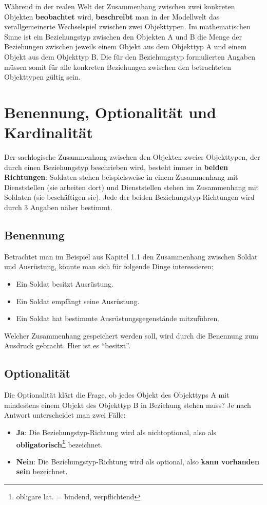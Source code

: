       W\"ahrend in der realen Welt der Zusammenhang zwischen zwei konkreten Objekten \textbf{beobachtet} wird, \textbf{beschreibt} man in der Modellwelt das verallgemeinerte Wechselspiel zwischen zwei Objekttypen. Im mathematischen Sinne ist ein Beziehungstyp zwischen den Objekten A und B die Menge der Beziehungen zwischen jeweils einem Objekt aus dem Objekttyp A und einem Objekt aus dem Objekttyp B. Die f\"ur den Beziehungstyp formulierten Angaben m\"ussen somit f\"ur alle konkreten Beziehungen zwischen den betrachteten Objekttypen g\"ultig sein.
      \section{Benennung, Optionalit\"at und Kardinalit\"at}\label{naming_optionaliy_kardinality}
        Der sachlogische Zusammenhang zwischen den Objekten zweier Objekttypen, der durch einen Beziehungstyp beschrieben wird, besteht immer in \textbf{beiden Richtungen}: Soldaten stehen beispielsweise in einem Zusammenhang mit Dienststellen (sie arbeiten dort) und Dienststellen stehen im Zusammenhang mit Soldaten (sie besch\"aftigen sie). Jede der beiden Beziehungstyp-Richtungen wird durch 3 Angaben n\"aher bestimmt.
        \subsection{Benennung}
          Betrachtet man im Beispiel aus Kapitel 1.1 den Zusammenhang zwischen Soldat und Ausr\"ustung, k\"onnte man sich f\"ur folgende Dinge interessieren:
          \begin{itemize}
            \item Ein Soldat besitzt Ausr\"ustung.
            \item Ein Soldat empf\"angt seine Ausr\"ustung.
            \item Ein Soldat hat bestimmte Ausr\"ustungsgegenst\"ande mitzuf\"uhren.
          \end{itemize}
          Welcher Zusammenhang gespeichert werden soll, wird durch die Benennung zum Ausdruck gebracht.
          Hier ist es \enquote{besitzt}.
        \subsection{Optionalit\"at}
          Die Optionalit\"at kl\"art die Frage, ob jedes Objekt des Objekttyps A mit mindestens einem Objekt des Objekttyp B in Beziehung stehen muss? Je nach Antwort unterscheidet man zwei F\"alle:
          \begin{itemize}
            \item \textbf{Ja}: Die Beziehungstyp-Richtung wird als nichtoptional, also als \textbf{obligatorisch\footnote{obligare lat. = bindend, verpflichtend}} bezeichnet.
            \item \textbf{Nein}: Die Beziehungstyp-Richtung wird als optional, also \textbf{kann vorhanden sein} bezeichnet.
          \end{itemize}
